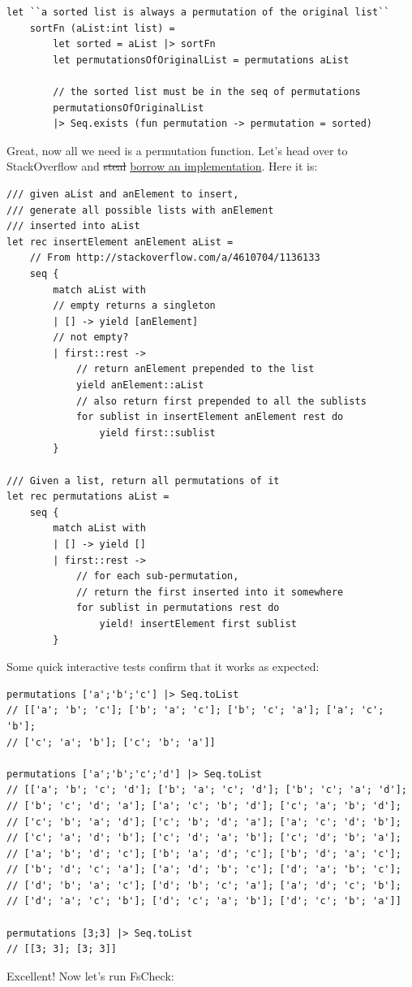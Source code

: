 \begin{verbatim}
let ``a sorted list is always a permutation of the original list`` 
    sortFn (aList:int list) = 
        let sorted = aList |> sortFn 
        let permutationsOfOriginalList = permutations aList 

        // the sorted list must be in the seq of permutations
        permutationsOfOriginalList 
        |> Seq.exists (fun permutation -> permutation = sorted) 
\end{verbatim}
Great, now all we need is a permutation function.
Let's head over to StackOverflow and \sout{steal}
\href{http://stackoverflow.com/a/4610704/1136133}{borrow an
implementation}. Here it is:

\begin{verbatim}
/// given aList and anElement to insert,
/// generate all possible lists with anElement 
/// inserted into aList 
let rec insertElement anElement aList =
	// From http://stackoverflow.com/a/4610704/1136133
	seq { 
		match aList with
		// empty returns a singleton
		| [] -> yield [anElement] 
		// not empty? 
		| first::rest ->
			// return anElement prepended to the list
			yield anElement::aList
			// also return first prepended to all the sublists
			for sublist in insertElement anElement rest do
				yield first::sublist
		}

/// Given a list, return all permutations of it
let rec permutations aList =
	seq { 
		match aList with
		| [] -> yield []
		| first::rest ->
			// for each sub-permutation, 
			// return the first inserted into it somewhere
			for sublist in permutations rest do
				yield! insertElement first sublist
		}
\end{verbatim}
Some quick interactive tests confirm that it works as expected:

\begin{verbatim}
permutations ['a';'b';'c'] |> Seq.toList
// [['a'; 'b'; 'c']; ['b'; 'a'; 'c']; ['b'; 'c'; 'a']; ['a'; 'c'; 'b'];
// ['c'; 'a'; 'b']; ['c'; 'b'; 'a']]

permutations ['a';'b';'c';'d'] |> Seq.toList
// [['a'; 'b'; 'c'; 'd']; ['b'; 'a'; 'c'; 'd']; ['b'; 'c'; 'a'; 'd'];
// ['b'; 'c'; 'd'; 'a']; ['a'; 'c'; 'b'; 'd']; ['c'; 'a'; 'b'; 'd'];
// ['c'; 'b'; 'a'; 'd']; ['c'; 'b'; 'd'; 'a']; ['a'; 'c'; 'd'; 'b'];
// ['c'; 'a'; 'd'; 'b']; ['c'; 'd'; 'a'; 'b']; ['c'; 'd'; 'b'; 'a'];
// ['a'; 'b'; 'd'; 'c']; ['b'; 'a'; 'd'; 'c']; ['b'; 'd'; 'a'; 'c'];
// ['b'; 'd'; 'c'; 'a']; ['a'; 'd'; 'b'; 'c']; ['d'; 'a'; 'b'; 'c'];
// ['d'; 'b'; 'a'; 'c']; ['d'; 'b'; 'c'; 'a']; ['a'; 'd'; 'c'; 'b'];
// ['d'; 'a'; 'c'; 'b']; ['d'; 'c'; 'a'; 'b']; ['d'; 'c'; 'b'; 'a']]

permutations [3;3] |> Seq.toList
// [[3; 3]; [3; 3]]
\end{verbatim}
Excellent! Now let's run FsCheck:

